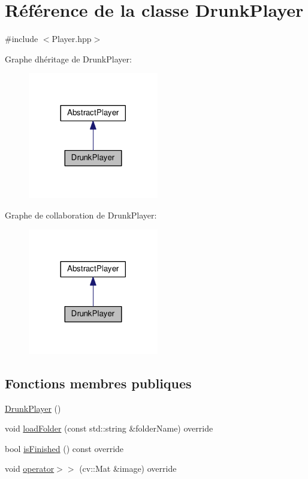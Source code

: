 \hypertarget{classDrunkPlayer}{}\section{Référence de la classe Drunk\+Player}
\label{classDrunkPlayer}


{\ttfamily \#include $<$Player.\+hpp$>$}



Graphe d\textquotesingle{}héritage de Drunk\+Player\+:\nopagebreak
\begin{figure}[H]
\begin{center}
\leavevmode
\includegraphics[width=161pt]{d5/de6/classDrunkPlayer__inherit__graph}
\end{center}
\end{figure}


Graphe de collaboration de Drunk\+Player\+:\nopagebreak
\begin{figure}[H]
\begin{center}
\leavevmode
\includegraphics[width=161pt]{d6/d92/classDrunkPlayer__coll__graph}
\end{center}
\end{figure}
\subsection*{Fonctions membres publiques}
\begin{DoxyCompactItemize}
\item 
\hyperlink{classDrunkPlayer_a39c64a774a19456f3a4c194ec5e1131f}{Drunk\+Player} ()
\item 
void \hyperlink{classDrunkPlayer_a235e60ea8a97c4d26277b066c2cebe80}{load\+Folder} (const std\+::string \&folder\+Name) override
\item 
bool \hyperlink{classDrunkPlayer_a9c032dda7df01fafc757fb1f4e265bb4}{is\+Finished} () const override
\item 
void \hyperlink{classDrunkPlayer_a2662f5010e15c95ca6639f56f012aed1}{operator$>$$>$} (cv\+::\+Mat \&image) override
\end{DoxyCompactItemize}
